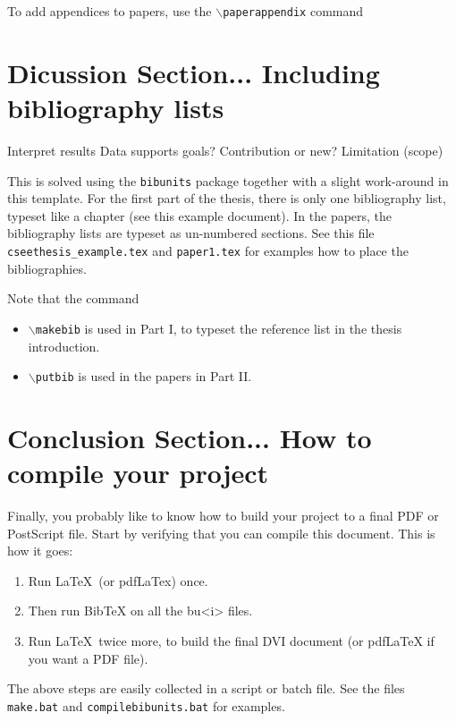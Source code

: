 To add appendices to papers, use the
\texttt{$\backslash$paperappendix} command

\section{Dicussion Section... Including bibliography lists\label{sec:bib}}
Interpret results
Data supports goals?
Contribution or new?
Limitation (scope)

This is solved using the \texttt{bibunits} package together with a
slight work-around in this template. For the first part of the
thesis, there is only one bibliography list, typeset like a chapter
(see this example document). In the papers, the bibliography lists
are typeset as un-numbered sections. See this file
\texttt{cseethesis\_example.tex} and \texttt{paper1.tex} for examples
how to place the bibliographies. 

Note that the command
\begin{itemize}
	\item \texttt{$\backslash$makebib} is used in Part I, to typeset the reference list in the thesis introduction.
	\item \texttt{$\backslash$putbib} is used in the papers in Part II.
\end{itemize}

\section{Conclusion Section... How to compile your project}
Finally, you probably like to know how to build your project to a
final PDF or PostScript file. Start by verifying that you can
compile this document. This is how it goes:
%
\begin{enumerate}
    \item Run \LaTeX\ (or pdfLaTex) once.
    \item Then run BibTeX on all the
    bu<i> files.
    \item Run \LaTeX\ twice more, to build the final DVI document
    (or pdfLaTeX if you want a PDF file).
\end{enumerate}

The above steps are easily collected in a script or batch file. See
the files \texttt{make.bat} and \texttt{compilebibunits.bat} for
examples.

